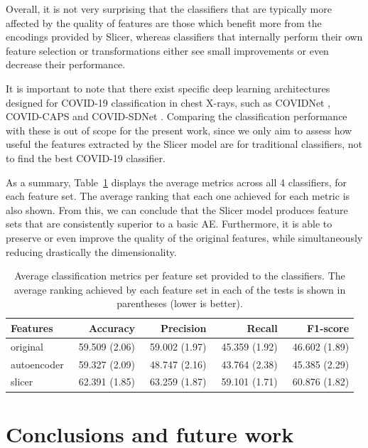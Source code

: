 Overall, it is not very surprising that the classifiers that are typically more affected by the quality of features are those which benefit more from the encodings provided by Slicer, whereas classifiers that internally perform their own feature selection or transformations either see small improvements or even decrease their performance.

It is important to note that there exist specific deep learning architectures designed for COVID-19 classification in chest X-rays, such as COVIDNet \cite{wang2020covid}, COVID-CAPS \cite{afshar2020covid} and COVID-SDNet \cite{9254002}. Comparing the classification performance with these is out of scope for the present work, since we only aim to assess how useful the features extracted by the Slicer model are for traditional classifiers, not to find the best COVID-19 classifier.

As a summary, Table~\ref{p7tab:overall} displays the average metrics across all 4 classifiers, for each feature set. The average ranking that each one achieved for each metric is also shown. From this, we can conclude that the Slicer model produces feature sets that are consistently superior to a basic AE. Furthermore, it is able to preserve or even improve the quality of the original features, while simultaneously reducing drastically the dimensionality.  

\begin{table}[htbp]
    \centering
    \begin{tabular}{lrrrr}
\toprule
Features & Accuracy & Precision & Recall & F1-score\\
\midrule
original & 59.509 (2.06) & 59.002 (1.97) & 45.359 (1.92) & 46.602 (1.89)\\
autoencoder & ~59.327 (2.09) & ~48.747 (2.16) & ~43.764 (2.38) & ~45.385 (2.29)\\
slicer & 62.391 (1.85) & 63.259 (1.87) & 59.101 (1.71) & 60.876 (1.82)\\
\bottomrule
\end{tabular}
    \caption{Average classification metrics per feature set provided to the classifiers. The average ranking achieved by each feature set in each of the tests is shown in parentheses (lower is better).}
    \label{p7tab:overall}
\end{table}


\section{Conclusions and future work}\label{p7sec.conc}

